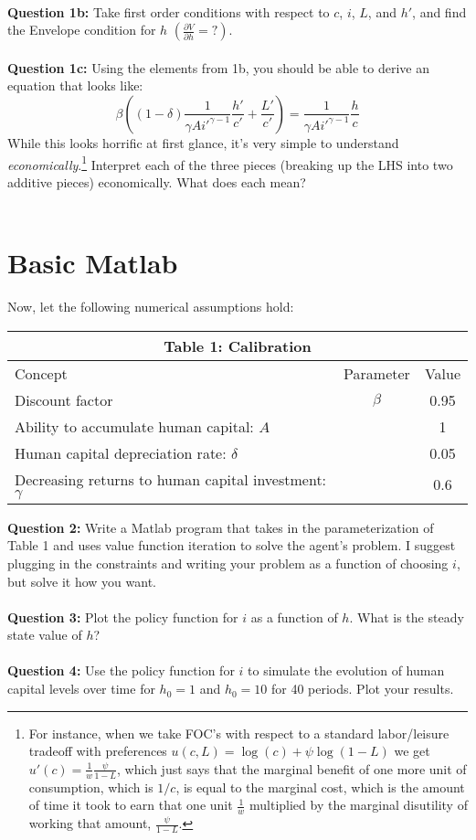 \documentclass[11pt]{article}
\begin{document}
\ \\
\textbf{Question 1b:} Take first order conditions with respect to $c$, $i$, $L$, and $h'$, and find the Envelope condition for $h$ $\left(\frac{\partial V}{\partial h}=?\right)$.\\
 \ \\

\textbf{Question 1c:} Using the elements from 1b, you should be able to derive an equation that looks like: $$\beta \left((1-\delta)\frac{1}{\gamma A i'^{\gamma-1}}\frac{h'}{c'}+\frac{L'}{c'}\right)=\frac{1}{\gamma A i'^{\gamma-1}}\frac{h}{c}$$
While this looks horrific at first glance, it's very simple to understand \emph{economically}.\footnote{For instance, when we take FOC's with respect to a standard labor/leisure tradeoff with preferences $u(c,L)=\log(c)+\psi\log(1-L)$ we get $u'(c)=\frac{1}{w}\frac{\psi}{1-L}$, which just says that the marginal benefit of one more unit of consumption, which is $1/c$, is equal to the marginal cost, which is the amount of time it took to earn that one unit $\frac{1}{w}$ multiplied by the marginal disutility of working that amount, $\frac{\psi}{1-L}$.}  Interpret each of the three pieces (breaking up the LHS into two additive pieces) economically. What does each mean?\\
 \ \\

\clearpage
\section{Basic Matlab}
Now, let the following numerical assumptions hold:
\begin{table}[ht!]
\centering
\begin{tabular}{lcc}
\hline
\hline
\multicolumn{3}{c}{Table 1: Calibration}\\
\hline
Concept & Parameter & Value \\ 
Discount factor & $\beta$ & 0.95\\
Ability to accumulate human capital: $A$ &  & 1\\
Human capital depreciation rate: $\delta$ &  & 0.05\\
Decreasing returns to human capital investment: $\gamma$ &  & 0.6\\
\hline
\hline
\end{tabular}
\end{table}

\textbf{Question 2:} Write a Matlab program that takes in the parameterization of Table 1 and uses value function iteration to solve the agent's problem.  I suggest plugging in the constraints and writing your problem as a function of choosing $i$, but solve it how you want.\\
\ \\

\textbf{Question 3:} Plot the policy function for $i$ as a function of $h$.  What is the steady state value of $h$?\\
\ \\

\textbf{Question 4:} Use the policy function for $i$ to simulate the evolution of human capital levels over time for $h_0=1$ and $h_0=10$ for 40 periods.  Plot your results.\\
\end{document}
